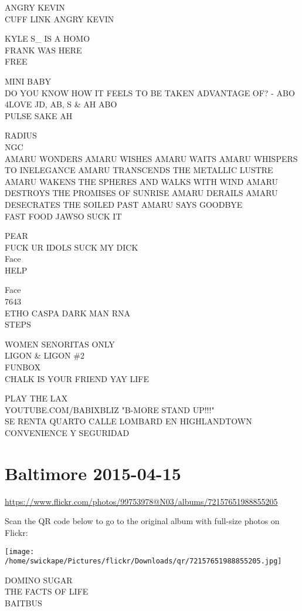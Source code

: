 \documentclass[10pt,letterpaper]{article}
\begin{document}
ANGRY KEVIN\\
CUFF LINK ANGRY KEVIN

KYLE S\_ IS A HOMO\\
FRANK WAS HERE\\
FREE

MINI BABY\\
DO YOU KNOW HOW IT FEELS TO BE TAKEN ADVANTAGE OF? {-} ABO\\
4LOVE JD, AB, S \& AH ABO\\
PULSE SAKE AH

RADIUS\\
NGC\\
AMARU WONDERS AMARU WISHES AMARU WAITS AMARU WHISPERS TO INELEGANCE AMARU TRANSCENDS THE METALLIC LUSTRE AMARU WAKENS THE SPHERES AND WALKS WITH WIND AMARU DESTROYS THE PROMISES OF SUNRISE AMARU DERAILS AMARU DESECRATES THE SOILED PAST AMARU SAYS GOODBYE\\
FAST FOOD JAWSO SUCK IT

PEAR\\
FUCK UR IDOLS SUCK MY DICK\\
Face\\
HELP

Face\\
7643\\
ETHO CASPA DARK MAN RNA\\
STEPS

WOMEN SENORITAS ONLY\\
LIGON \& LIGON \#2\\
FUNBOX\\
CHALK IS YOUR FRIEND YAY LIFE

PLAY THE LAX\\
YOUTUBE.COM/BABIXBLIZ "B{-}MORE STAND UP!!!"\\
SE RENTA QUARTO CALLE LOMBARD EN HIGHLANDTOWN CONVENIENCE Y SEGURIDAD
\pagebreak

\section*{Baltimore 2015-04-15}

\url{https://www.flickr.com/photos/99753978@N03/albums/72157651988855205}

Scan the QR code below to go to the original album with full-size photos on Flickr:

\texttt{[image: /home/swickape/Pictures/flickr/Downloads/qr/72157651988855205.jpg]}
\pagebreak

DOMINO SUGAR\\
THE FACTS OF LIFE\\
BAITBUS
\end{document}
